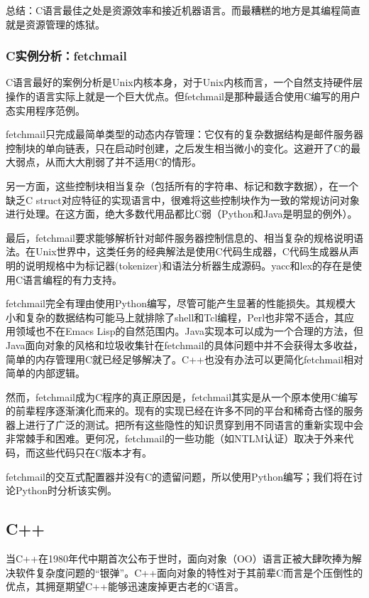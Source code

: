 \documentclass[12pt,oneside]{book}
\begin{document}
总结：C语言最佳之处是资源效率和接近机器语言。而最糟糕的地方是其编程简直就是资源管理的炼狱。


\subsubsection{C实例分析：fetchmail}
C语言最好的案例分析是Unix内核本身，对于Unix内核而言，一个自然支持硬件层操作的语言实际上就是一个巨大优点。但fetchmail是那种最适合使用C编写的用户态实用程序范例。

fetchmail只完成最简单类型的动态内存管理：它仅有的复杂数据结构是邮件服务器控制块的单向链表，只在启动时创建，之后发生相当微小的变化。这避开了C的最大弱点，从而大大削弱了并不适用C的情形。

另一方面，这些控制块相当复杂（包括所有的字符串、标记和数字数据），在一个缺乏C struct对应特征的实现语言中，很难将这些控制块作为一致的常规访问对象进行处理。在这方面，绝大多数代用品都比C弱（Python和Java是明显的例外）。

最后，fetchmail要求能够解析针对邮件服务器控制信息的、相当复杂的规格说明语法。在Unix世界中，这类任务的经典解法是使用C代码生成器，C代码生成器从声明的说明规格中为标记器(tokenizer)和语法分析器生成源码。yacc和lex的存在是使用C语言编程的有力支持。

fetchmail完全有理由使用Python编写，尽管可能产生显著的性能损失。其规模大小和复杂的数据结构可能马上就排除了shell和Tcl编程，Perl也非常不适合，其应用领域也不在Emacs Lisp的自然范围内。Java实现本可以成为一个合理的方法，但Java面向对象的风格和垃圾收集针在fetchmail的具体问题中并不会获得太多收益，简单的内存管理用C就已经足够解决了。C++也没有办法可以更简化fetchmail相对简单的内部逻辑。

然而，fetchmail成为C程序的真正原因是，fetchmail其实是从一个原本使用C编写的前辈程序逐渐演化而来的。现有的实现已经在许多不同的平台和稀奇古怪的服务器上进行了广泛的测试。把所有这些隐性的知识贯穿到用不同语言的重新实现中会非常棘手和困难。更何况，fetchmail的一些功能（如NTLM认证）取决于外来代码，而这些代码只在C版本才有。

fetchmail的交互式配置器并没有C的遗留问题，所以使用Python编写；我们将在讨论Python时分析该实例。

\subsection{C++}
当C++在1980年代中期首次公布于世时，面向对象（OO）语言正被大肆吹捧为解决软件复杂度问题的“银弹”。C++面向对象的特性对于其前辈C而言是个压倒性的优点，其拥趸期望C++能够迅速废掉更古老的C语言。
\end{document}
